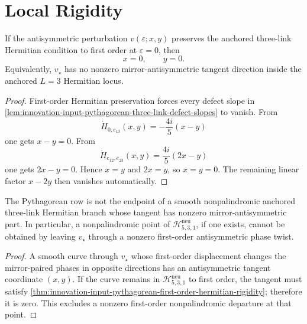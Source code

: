 \section{Local Rigidity}
\label{sec:innovation-input-pythagorean-local-rigidity}

\begin{theorem}
\label{thm:innovation-input-pythagorean-first-order-hermitian-rigidity}
If the antisymmetric perturbation
$v(\varepsilon;x,y)$ preserves the anchored three-link Hermitian
condition to first order at $\varepsilon=0$, then
$$
x=0,
\qquad
y=0.
$$
Equivalently, $v_\star$ has no nonzero mirror-antisymmetric tangent
direction inside the anchored $L=3$ Hermitian locus.
\end{theorem}

\begin{proof}
First-order Hermitian preservation forces every defect slope in
\autoref{lem:innovation-input-pythagorean-three-link-defect-slopes} to
vanish. From
$$
\dot H_{0,e_{13}}(x,y)
=
-\frac{4i}{5}(x-y)
$$
one gets $x-y=0$. From
$$
\dot H_{e_{12},e_{23}}(x,y)
=
\frac{4i}{5}(2x-y)
$$
one gets $2x-y=0$. Hence $x=y$ and $2x=y$, so $x=y=0$. The remaining
linear factor $x-2y$ then vanishes automatically.
\end{proof}

\begin{corollary}
\label{cor:innovation-input-no-first-order-nonpalindromic-branch-pythagorean}
The Pythagorean row is not the endpoint of a smooth nonpalindromic
anchored three-link Hermitian branch whose tangent has nonzero
mirror-antisymmetric part. In particular, a nonpalindromic point of
$\mathcal H_{5,3,1}^{\mathrm{neu}}$, if one exists, cannot be obtained
by leaving $v_\star$ through a nonzero first-order antisymmetric phase
twist.
\end{corollary}

\begin{proof}
A smooth curve through $v_\star$ whose first-order displacement changes
the mirror-paired phases in opposite directions has an antisymmetric
tangent coordinate $(x,y)$. If the curve remains in
$\mathcal H_{5,3,1}^{\mathrm{neu}}$ to first order, the tangent must
satisfy
\autoref{thm:innovation-input-pythagorean-first-order-hermitian-rigidity};
therefore it is zero. This excludes a nonzero first-order
nonpalindromic departure at that point.
\end{proof}

